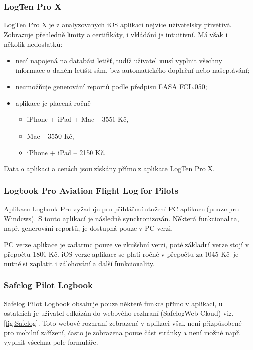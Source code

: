 \documentclass[thesis=M,czech]{FITthesis}[2012/06/26]
\begin{document}
\subsubsection{LogTen Pro X}
LogTen Pro X je z analyzovaných iOS aplikací nejvíce uživatelsky přívětivá. Zobrazuje přehledně limity a certifikáty, i vkládání je intuitivní. Má však i několik nedostatků: 
\begin{itemize}
\item není napojená na databázi letišť, tudíž uživatel musí vyplnit všechny informace o daném letišti sám, bez automatického doplnění nebo našeptávání;
\item neumožňuje generování reportů podle předpisu EASA FCL.050;
\item aplikace je placená ročně --
	\begin{itemize}
	\item iPhone + iPad + Mac -- 3550 Kč,
	\item Mac -- 3550 Kč,
	\item iPhone + iPad -- 2150 Kč.
	\end{itemize}
\end{itemize}
Data o aplikaci a cenách jsou získány přímo z aplikace LogTen Pro X. 

\subsubsection{Logbook Pro Aviation Flight Log for Pilots}
Aplikace Logbook Pro vyžaduje pro přihlášení stažení PC aplikace (pouze pro Windows). S touto aplikací je následně synchronizován. Některá funkcionalita, např. generování reportů, je dostupná pouze v PC verzi.

PC verze aplikace je zadarmo pouze ve zkušební verzi, poté základní verze stojí v přepočtu 1800 Kč. iOS verze aplikace se platí ročně v přepočtu za 1045 Kč, je nutné si zaplatit i zálohování a další funkcionality. \cite{SafelogPrices}

\subsubsection{Safelog Pilot Logbook}
Safelog Pilot Logbook obsahuje pouze některé funkce přímo v aplikaci, u ostatních je uživatel odkázán do webového rozhraní (SafelogWeb Cloud) viz. \ref{fig:Safelog}. Toto webové rozhraní zobrazené v aplikaci však není přizpůsobené pro mobilní zařízení, často je zobrazena pouze část stránky a není možné např. vyplnit všechna pole formuláře.
\end{document}
